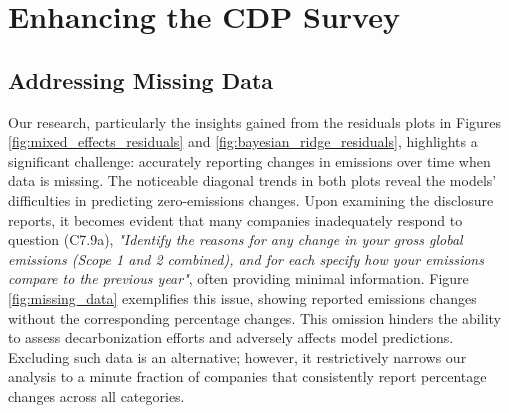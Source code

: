 


\section{Enhancing the CDP Survey}

\subsection{Addressing Missing Data}
Our research, particularly the insights gained from the residuals plots in Figures \ref{fig:mixed_effects_residuals} and \ref{fig:bayesian_ridge_residuals}, highlights a significant challenge: accurately reporting changes in emissions over time when data is missing. The noticeable diagonal trends in both plots reveal the models' difficulties in predicting zero-emissions changes. Upon examining the disclosure reports, it becomes evident that many companies inadequately respond to question (C7.9a), \textit{"Identify the reasons for any change in your gross global emissions (Scope 1 and 2 combined), and for each specify how your emissions compare to the previous year"}, often providing minimal information. Figure \ref{fig:missing_data} exemplifies this issue, showing reported emissions changes without the corresponding percentage changes. This omission hinders the ability to assess decarbonization efforts and adversely affects model predictions. Excluding such data is an alternative; however, it restrictively narrows our analysis to a minute fraction of companies that consistently report percentage changes across all categories.

